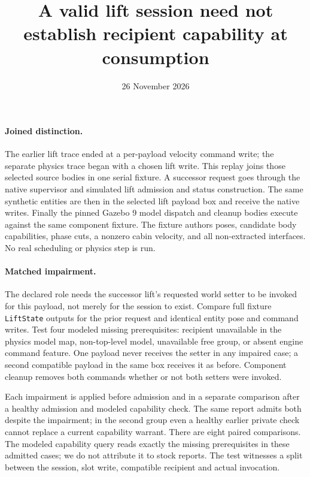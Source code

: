 \documentclass[11pt]{article}
\title{A valid lift session need not establish recipient capability at consumption}
\date{26 November 2026}
\begin{document}
\maketitle
\paragraph{Joined distinction.}
The earlier lift trace ended at a per-payload velocity command
write; the separate physics trace began with a chosen lift write.
This replay joins those selected source bodies in one serial
fixture. A successor request goes through the native supervisor
and simulated lift admission and status construction. The same
synthetic entities are then in the selected lift payload box and
receive the native writes. Finally the pinned Gazebo 9 model
dispatch and cleanup bodies execute against the same component
fixture. The fixture authors poses, candidate body capabilities,
phase cuts, a nonzero cabin velocity, and all non-extracted
interfaces. No real scheduling or physics step is run.

\paragraph{Matched impairment.}
The declared role needs the successor lift's requested world setter
to be invoked for this payload, not merely for the session to exist.
Compare full fixture \texttt{LiftState} outputs for the prior
request and identical entity pose and command writes. Test four
modeled missing prerequisites: recipient unavailable in the
physics model map, non-top-level model, unavailable free group,
or absent engine command feature. One payload never receives the
setter in any impaired case; a second compatible payload in the
same box receives it as before. Component cleanup removes both
commands whether or not both setters were invoked.

Each impairment is applied before admission and in a separate
comparison after a healthy admission and modeled capability check.
The same report admits both despite the impairment; in the second
group even a healthy earlier private check cannot replace a
current capability warrant. There are eight paired comparisons.
The modeled capability query reads exactly the missing prerequisites
in these admitted cases; we do not attribute it to stock reports.
The test witnesses a split between the session, slot write,
compatible recipient and actual invocation.
\end{document}
